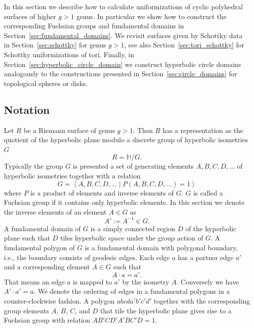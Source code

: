 \documentclass[Thesis]{subfiles}
\begin{document}

In this section we describe how to calculate uniformizations of cyclic polyhedral surfaces of higher $g>1$ genus. 
In particular we show how to construct the corresponding Fuchsian groups and fundamental domains in Section~\ref{sec:fundamental_domains}.
We revisit surfaces given by Schottky data in Section~\ref{sec:schottky} for genus $g>1$, see also Section~\ref{sec:tori_schottky} for Schottky uniformizations of tori.
Finally, in Section~\ref{sec:hyperbolic_circle_domain} we construct hyperbolic circle domains analogously to the constructions presented in Section~\ref{sec:circle_domains} for topological spheres or disks.

\subsection{Notation}

Let $R$ be a Riemann surface of genus $g>1$. 
Then $R$ has a representation as the quotient of the hyperbolic plane modulo a discrete group of hyperbolic isometries $G$
\begin{equation}
R=\mathbb{H} / G.
\end{equation}
Typically the group $G$ is presented a set of generating elements $A,B,C,D,\ldots$ of hyperbolic isometries together with a relation 
\begin{equation}
G=\left<A,B,C,D,\ldots\mid P(A,B,C,D,\ldots)=1\right>
\end{equation}
where $P$ is a product of elements and inverse elements of $G$. 
$G$ is called a Fuchsian group if it contains only hyperbolic elements.
In this section we denote the inverse elements of an element $A\in G$ as 
\begin{equation}
A':=A^{-1}\in G.
\end{equation}
A fundamental domain of $G$ is a simply connected region $D$ of the hyperbolic plane such that $D$ tiles hyperbolic space under the group action of $G$.
A fundamental polygon of $G$ is a fundamental domain with polygonal boundary, i.e., the boundary consists of geodesic edges.
Each edge $a$ has a partner edge $a'$ and a corresponding element $A\in G$ such that 
\begin{equation}
A\cdot a=a'.
\end{equation}
That means an edge $a$ is mapped to $a'$ by the isometry $A$. Conversely we have $A'\cdot a'=a$.
We denote the ordering of edges in a fundamental polygons in a counter-clockwise fashion. 
A polygon $abcda'b'c'd'$ together with the corresponding group elements $A$, $B$, $C$, and $D$ that tile the hyperbolic plane gives rise to a Fuchsian group with relation $AB'CD'A'BC'D=1$.
\end{document}
